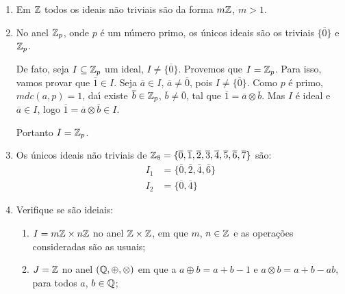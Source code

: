 \begin{exemplo}
    \begin{enumerate}[label={\arabic*})]
        \item Em $\mathbb{Z}$ todos os ideais n{\~a}o triviais s{\~a}o da forma $m\mathbb{Z}$, $m > 1$.
        \item No anel $\mathbb{Z}_p$, onde $p$ {\'e} um n{\'u}mero primo, os {\'u}nicos ideais  s{\~a}o os triviais $\{\overline{0}\}$ e $\mathbb{Z}_p$.
        \begin{solucao}
            De fato, seja $I \subseteq \mathbb{Z}_p$ um ideal, $I \neq \{\overline{0}\}$. Provemos que $I = \mathbb{Z}_p$. Para isso, vamos provar que $\overline{1} \in I$. Seja $\overline{a} \in I$,
            $\overline{a} \neq \overline{0}$, pois $I \neq \{\overline{0}\}$. Como $p$ {\'e} primo, $mdc(a,p) = 1$, da{\'\i} existe $\overline{b} \in \mathbb{Z}_p$, $\overline{b} \neq
            \overline{0}$, tal que $\overline{1} = \overline{a} \otimes \overline{b}$. Mas $I$ {\'e} ideal e $\overline{a} \in I$, logo $\overline{1} = \overline{a} \otimes
            \overline{b} \in I$.

            Portanto $I = \mathbb{Z}_p$.
        \end{solucao}

        \item Os {\'u}nicos ideais n{\~a}o triviais de $\mathbb{Z}_8 = \{\overline{0}, \overline{1}, \overline{2}, \overline{3}, \overline{4}, \overline{5}, \overline{6}, \overline{7}\}$
            s{\~a}o:
        \begin{align*}
            I_1 &= \{\overline{0}, \overline{2}, \overline{4}, \overline{6}\}\\
            I_2 &=\{\overline{0}, \overline{4}\}
        \end{align*}

        \item Verifique se s\~ao ideiais:
            \begin{enumerate}[label=({\alph*})]
                \item $I = m\mathbb{Z} \times n\mathbb{Z}$ no anel $\mathbb{Z} \times \mathbb{Z}$, em que $m$, $n \in \mathbb{Z}$ e as operações consideradas são as usuais;

                \item $J = \mathbb{Z}$ no anel $(\mathbb{Q}, \oplus, \otimes)$ em que a $a \oplus b = a + b - 1$ e $a \otimes b = a + b - ab$, para todos $a$, $b \in \mathbb{Q}$;


\end{enumerate}
\end{enumerate}
\end{exemplo}
